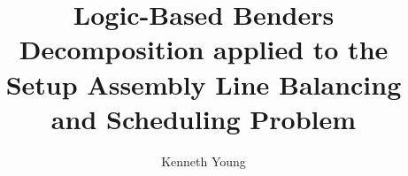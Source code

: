 \documentclass[mres, copyrightpage]{mqthesis}
\begin{document}
\frontmatter

\title{Logic-Based Benders Decomposition applied to the Setup Assembly Line Balancing and Scheduling Problem}
\author{Kenneth Young}

\titlepage


% 


\tableofcontents
\listoffigures
\listoftables

\mainmatter












\appendix






\backmatter

% 


\end{document}

